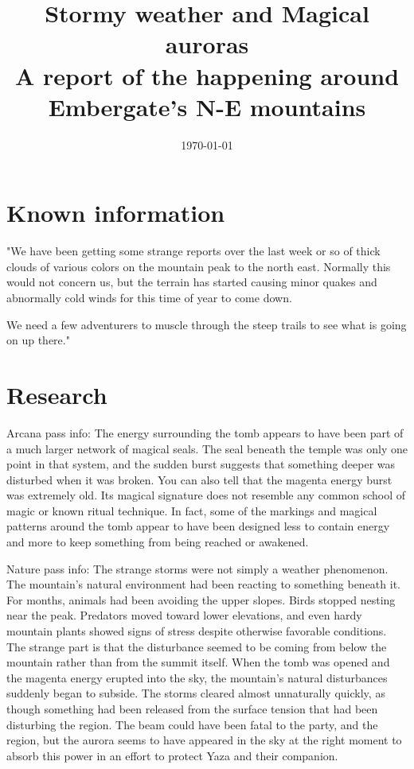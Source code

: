 \documentclass{article}
\title{Stormy weather and Magical auroras\\
\large A report of the happening around Embergate's N-E mountains}
\date{\today}
\begin{document}
    \maketitle

    \section*{Known information}

    "We have been getting some strange reports over the last week or so of thick clouds of various colors on the mountain peak to the north east. Normally this would not concern us, but the terrain has started causing minor quakes and abnormally cold winds for this time of year to come down.

    We need a few adventurers to muscle through the steep trails to see what is going on up there." 

    \section*{Research}

    Arcana pass info: The energy surrounding the tomb appears to have been part of a much larger network of magical seals. The seal beneath the temple was only one point in that system, and the sudden burst suggests that something deeper was disturbed when it was broken. You can also tell that the magenta energy burst was extremely old. Its magical signature does not resemble any common school of magic or known ritual technique. In fact, some of the markings and magical patterns around the tomb appear to have been designed less to contain energy and more to keep something from being reached or awakened.

    Nature pass info: The strange storms were not simply a weather phenomenon. The mountain's natural environment had been reacting to something beneath it. For months, animals had been avoiding the upper slopes. Birds stopped nesting near the peak. Predators moved toward lower elevations, and even hardy mountain plants showed signs of stress despite otherwise favorable conditions. The strange part is that the disturbance seemed to be coming from below the mountain rather than from the summit itself. When the tomb was opened and the magenta energy erupted into the sky, the mountain's natural disturbances suddenly began to subside. The storms cleared almost unnaturally quickly, as though something had been released from the surface tension that had been disturbing the region. The beam could have been fatal to the party, and the region, but the aurora seems to have  appeared in the sky at the right moment to absorb this power in an effort to protect Yaza and their companion.
\end{document}
